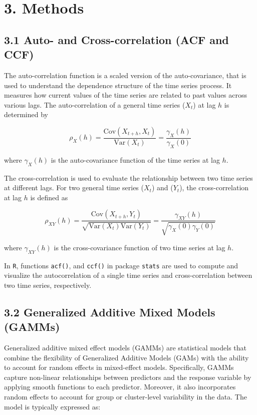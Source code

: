\documentclass[
  letterpaper,
  DIV=11,
  numbers=noendperiod]{scrartcl}
\begin{document}
\section{3. Methods}\label{methods}

\subsection{3.1 Auto- and Cross-correlation (ACF and
CCF)}\label{auto--and-cross-correlation-acf-and-ccf}

The auto-correlation function is a scaled version of the
auto-covariance, that is used to understand the dependence structure of
the time series process. It measures how current values of the time
series are related to past values across various lags. The
auto-correlation of a general time series (\(X_t\)) at lag \(h\) is
determined by

\[\rho_X(h)=\frac{\text{Cov}(X_{t+h},X_t)}{\text{Var}(X_t)}=\frac{\gamma_X(h)}{\gamma_X(0)}\]

where \(\gamma_X(h)\) is the auto-covariance function of the time series
at lag \(h\).

The cross-correlation is used to evaluate the relationship between two
time series at different lags. For two general time series (\(X_t\)) and
(\(Y_t\)), the cross-correlation at lag \(h\) is defined as

\[\rho_{XY}(h)=\frac{\text{Cov}(X_{t+h}, Y_t)}{\sqrt{\text{Var}(X_{t})\text{Var}(Y_t)}}=\frac{\gamma_{XY}(h)}{\sqrt{\gamma_X(0)\gamma_Y(0)}}\]

where \(\gamma_{XY}(h)\) is the cross-covariance function of two time
series at lag \(h\).

In \texttt{R}, functions \texttt{acf()}, and \texttt{ccf()} in package
\texttt{stats} are used to compute and visualize the autocorrelation of
a single time series and cross-correlation between two time series,
respectively.

\subsection{3.2 Generalized Additive Mixed Models
(GAMMs)}\label{generalized-additive-mixed-models-gamms}

Generalized additive mixed effect models (GAMMs) are statistical models
that combine the flexibility of Generalized Additive Models (GAMs) with
the ability to account for random effects in mixed-effect models.
Specifically, GAMMs capture non-linear relationships between predictors
and the response variable by applying smooth functions to each
predictor. Moreover, it also incorporates random effects to account for
group or cluster-level variability in the data. The model is typically
expressed as:
\end{document}
